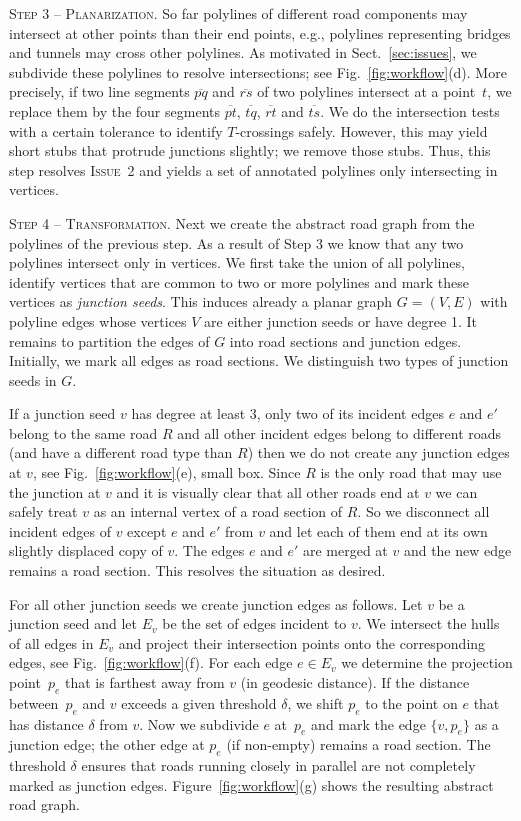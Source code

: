 \documentclass[a4paper,11pt]{article}
\newcommand{\ICrossings}{\textsc{Issue~2}\xspace}
\begin{document}
\textsc{Step 3 -- Planarization.} So far polylines of different road
components may intersect at other points than their end points, e.g.,
polylines representing bridges and tunnels may cross other
polylines. As motivated in Sect.~\ref{sec:issues}, we subdivide these
polylines to resolve intersections; see
Fig.~\ref{fig:workflow}(d). More precisely, if two line segments
$\overline{pq}$ and $\overline{rs}$ of two polylines intersect at a point~$t$, we
replace them by the four segments $\overline{pt}$, $\overline{tq}$,
$\overline{rt}$ and $\overline{ts}$. We do the intersection tests
with a certain tolerance to identify $T$-crossings
safely. However, this may yield short stubs that protrude
junctions slightly; we remove those stubs. Thus, this step resolves
\ICrossings and yields a set of annotated
 polylines only intersecting in vertices.


 \textsc{Step 4 -- Transformation.} 
 Next we create the abstract road
 graph from the polylines of the previous step. 
 As a result of Step 3 we know that any two polylines intersect only in vertices. We first take the union of all polylines, identify vertices that are common to two or more polylines and mark these vertices as \emph{junction seeds}. This induces already a planar graph $G=(V,E)$ with polyline edges whose vertices $V$ are either junction seeds or have degree 1. 
 It remains to partition the edges of $G$ into road sections and junction edges. Initially, we mark all edges as road sections. 
 We distinguish two types of junction seeds in $G$.
 
 If a junction seed $v$ has degree at least $3$, only two of its incident edges $e$ and $e'$ belong to the same road $R$ and all other incident edges belong to different roads (and have a different road type than $R$) then we do not create any junction edges at $v$, see Fig.~\ref{fig:workflow}(e), small box.
 Since $R$ is the only road that may use the junction at $v$ and it is visually clear that all other roads end at $v$ we can safely treat $v$ as an internal vertex of a road section of $R$.
 So we disconnect all incident edges of $v$ except $e$ and $e'$ from $v$ and let each of them end at its own slightly displaced copy of $v$. The edges $e$ and $e'$ are merged at $v$ and the new edge remains a road section. This resolves the situation as desired.
 
 For all other junction seeds we create junction edges as follows. Let $v$ be a junction seed and let $E_v$ be the set of edges incident to $v$. We intersect the hulls of all  edges in $E_v$ and project their intersection points onto the corresponding edges, see Fig.~\ref{fig:workflow}(f). For each edge $e \in E_v$ we determine the projection point~$p_e$ that is farthest away from $v$ (in geodesic distance). If the distance between~$p_e$ and $v$ exceeds a given threshold $\delta$, we shift $p_e$ to the point on $e$ that has distance $\delta$ from $v$. Now we subdivide $e$ at~$p_e$ and mark the edge $\{v,p_e\}$ as a junction edge; the other edge at $p_e$ (if non-empty) remains a road section. The threshold $\delta$ ensures that roads running closely in parallel are not completely marked as junction edges. Figure~\ref{fig:workflow}(g) shows the resulting abstract road graph. 
\end{document}

